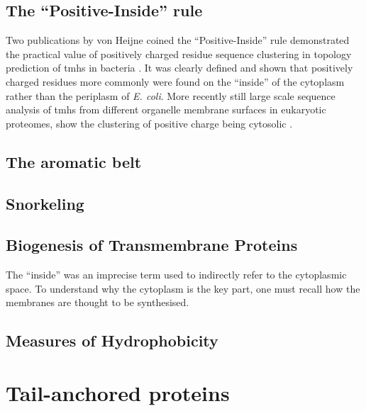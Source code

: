 \subsection{The ``Positive-Inside'' rule}

Two publications by von Heijne coined the ``Positive-Inside'' rule demonstrated the practical value of positively charged residue sequence clustering in topology prediction of \gls{tmh}s in bacteria \cite{VonHeijne1989,VonHeijne1992}. It was clearly defined and shown that positively charged residues more commonly were found on the ``inside'' of the cytoplasm rather than the periplasm of {\it E. coli}. More recently still large scale sequence analysis of \gls{tmh}s from different organelle membrane surfaces in eukaryotic proteomes, show the clustering of positive charge being cytosolic \cite{Sharpe2010, Baeza-Delgado2013, Pogozheva2013}.

\subsection{The aromatic belt}

\subsection{Snorkeling}

\subsection{Biogenesis of Transmembrane Proteins}

The ``inside'' was an imprecise term used to indirectly refer to the cytoplasmic space. To understand why the cytoplasm is the key part, one must recall how the membranes are thought to be synthesised.

\subsection{Measures of Hydrophobicity}

\section{Tail-anchored proteins}

